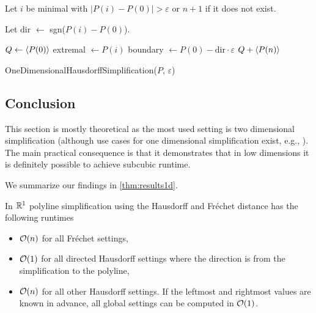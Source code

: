 \begin{algorithm}[htb]
  \DontPrintSemicolon
  \BlankLine
	Let \(i\) be minimal with \(|P(i)-P(0)| > \varepsilon\) or \(n+1\) if it does not exist. 

	Let dir \(\gets\) sgn(\(P(i)-P(0)\)).

	\(Q \gets \left\langle P(0)\right\rangle\)\;
	extremal \(\gets P(i)\)\;
	boundary \(\gets P(0) -\textrm{dir} \cdot \varepsilon\)\;
	\Return \(Q + \left\langle P(n)\right\rangle\)
	\caption{OneDimensionalHausdorffSimplification(\(P\), \(\varepsilon\))}
  \label{algo:hausdorff1d}
\end{algorithm}
\subsection{Conclusion}
This section is mostly theoretical as the most used setting is two dimensional simplification (although use cases for one dimensional simplification exist, e.g., \citeauthor{clustering_time_series}). The main practical consequence is that it demonstrates that in low dimensions it is definitely possible to achieve subcubic runtime.

We summarize our findings in \cref{thm:results1d}.
\begin{theorem}\label{thm:results1d}
  In \(\mathbb{R}^1\) polyline simplification using the Hausdorff and Fréchet distance has the following runtimes
	\begin{itemize}
		\item \(\mathcal{O}(n)\) for all Fréchet settings,
		\item \(\mathcal{O}(1)\) for all directed Hausdorff settings where the direction is from the simplification to the polyline,
		\item \(\mathcal{O}(n)\) for all other Hausdorff settings. If the leftmost and rightmost values are known in advance, all global settings can be computed in \(\mathcal{O}(1)\).
	\end{itemize}
\end{theorem}

